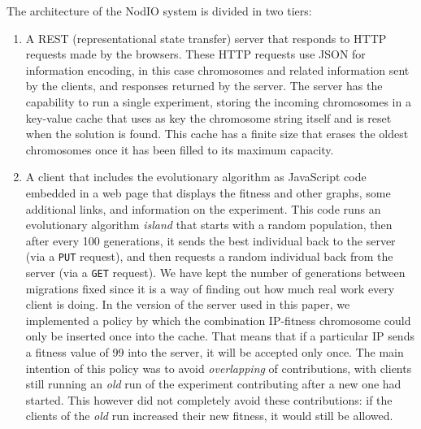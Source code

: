 \documentclass[runningheads,a4paper]{llncs}\usepackage[]{graphicx}\usepackage[]{color}
\begin{document}
The architecture of the {\sf NodIO} system is divided in two tiers:
\begin{enumerate}
\item A REST (representational state transfer) server that responds to
  HTTP requests made by the browsers. These HTTP requests use JSON for information 
  encoding, in this case chromosomes and related
  information sent by the clients, and responses returned by the
  server.  The server has the capability to
  run a single experiment, storing the incoming chromosomes in a
  key-value cache that uses as key the chromosome string itself and is
  reset when the solution is found. This cache has a finite 
  size that erases the oldest chromosomes once it has been filled to %
  its maximum capacity.  
\item A client that includes the evolutionary algorithm as
  JavaScript code embedded in a web page that displays the fitness and
  other graphs, some
  additional links, and information on the experiment. 
  This code runs
  an evolutionary algorithm {\em island} that starts with a random
  population, then after every 100 generations, it sends the best individual
  back to the server (via a {\tt PUT} request), and then requests a random
  individual back from the server (via a {\tt GET} request). We have
  kept the number of generations between migrations fixed since it is
  a way of finding out how much real work every client is doing. In
  the version of the server used in this paper, we implemented a
  policy by which the combination IP-fitness chromosome could only be
  inserted once into the cache. That means that if a particular IP
  sends a fitness value of 99 into the server, it will be accepted only
  once. The main intention of this policy was to avoid {\em
    overlapping} of contributions, with clients still running an {\em
    old} run of the experiment contributing after a new one had
  started. This however did not completely avoid these contributions: if the
  clients of the {\em old} run increased their new fitness, it would
  still be allowed. 
\end{enumerate}
\end{document}
